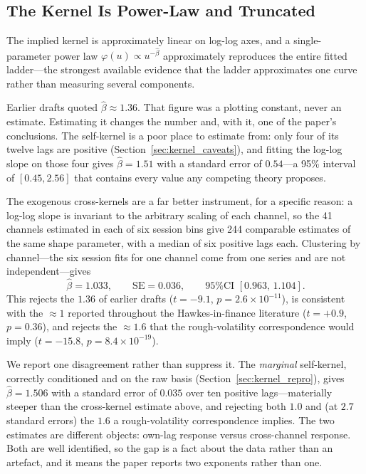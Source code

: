 \subsection{The Kernel Is Power-Law and Truncated}
\label{sec:powerlaw}

The implied kernel is approximately linear on log-log axes, and a
single-parameter power law $\varphi(u) \propto u^{-\hat\beta}$ approximately
reproduces the entire fitted ladder---the strongest available evidence that the
ladder approximates one curve rather than measuring several components.

Earlier drafts quoted $\hat\beta \approx 1.36$. That figure was a plotting
constant, never an estimate. Estimating it changes the number and, with it, one
of the paper's conclusions. The self-kernel is a poor place to estimate from:
only four of its twelve lags are positive (Section~\ref{sec:kernel_caveats}),
and fitting the log-log slope on those four gives
$\hat\beta = 1.51$ with a standard error of $0.54$---a 95\% interval of
$[0.45, 2.56]$ that contains every value any competing theory proposes.

The exogenous cross-kernels are a far better instrument, for a specific
reason: a log-log slope is invariant to the arbitrary scaling of each channel,
so the 41 channels estimated in each of six session bins give 244 comparable
estimates of the same shape parameter, with a median of six positive lags each.
Clustering by channel---the six session fits for one channel come from one
series and are not independent---gives
\begin{equation}
  \hat\beta = 1.033, \qquad \mathrm{SE} = 0.036, \qquad
  \text{95\% CI } [0.963,\, 1.104].
  \label{eq:beta_estimate}
\end{equation}
This rejects the $1.36$ of earlier drafts ($t = -9.1$,
$p = 2.6 \times 10^{-11}$), is consistent with the $\approx 1$ reported
throughout the Hawkes-in-finance literature ($t = +0.9$, $p = 0.36$), and
rejects the $\approx 1.6$ that the rough-volatility correspondence would imply
($t = -15.8$, $p = 8.4 \times 10^{-19}$).

We report one disagreement rather than suppress it. The \emph{marginal}
self-kernel, correctly conditioned and on the raw basis
(Section~\ref{sec:kernel_repro}), gives $\hat\beta = 1.506$ with a standard
error of $0.035$ over ten positive lags---materially steeper than the
cross-kernel estimate above, and rejecting both $1.0$ and (at $2.7$ standard
errors) the $1.6$ a rough-volatility correspondence implies. The two estimates
are different objects: own-lag response versus cross-channel response. Both are
well identified, so the gap is a fact about the data rather than an artefact,
and it means the paper reports two exponents rather than one.

